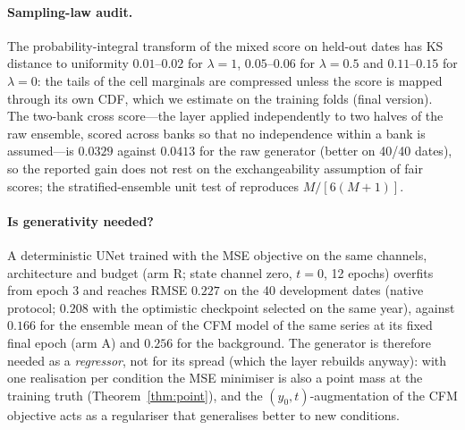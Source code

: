\documentclass[11pt]{article}
\begin{document}
\paragraph{Sampling-law audit.} The probability-integral transform of the mixed score on held-out dates has KS distance to uniformity $0.01$--$0.02$ for $\lambda=1$, $0.05$--$0.06$ for $\lambda=0.5$ and $0.11$--$0.15$ for $\lambda=0$: the tails of the cell marginals are compressed unless the score is mapped through its own CDF, which we estimate on the training folds (final version). The two-bank cross score---the layer applied independently to two halves of the raw ensemble, scored across banks so that no independence within a bank is assumed---is $0.0329$ against $0.0413$ for the raw generator (better on 40/40 dates), so the reported gain does not rest on the exchangeability assumption of fair scores; the stratified-ensemble unit test of \citet{roberts2026} reproduces $M/[6(M+1)]$.

\paragraph{Is generativity needed?} A deterministic UNet trained with the MSE objective on the same channels, architecture and budget (arm R; state channel zero, $t=0$, 12 epochs) overfits from epoch 3 and reaches RMSE $0.227$ on the 40 development dates (native protocol; $0.208$ with the optimistic checkpoint selected on the same year), against $0.166$ for the ensemble mean of the CFM model of the same series at its fixed final epoch (arm A) and $0.256$ for the background. The generator is therefore needed as a \emph{regressor}, not for its spread (which the layer rebuilds anyway): with one realisation per condition the MSE minimiser is also a point mass at the training truth (Theorem~\ref{thm:point}), and the $(y_0,t)$-augmentation of the CFM objective acts as a regulariser that generalises better to new conditions.
\end{document}
